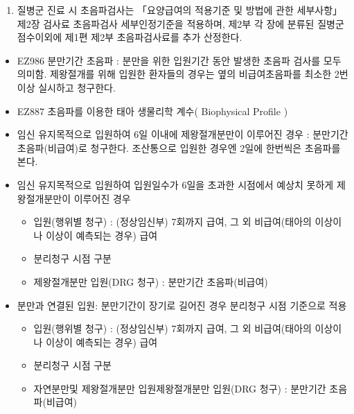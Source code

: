 \begin{myshadowbox}
\begin{enumerate}[15.]\tightlist
\item 질병군 진료 시 초음파검사는 「요양급여의 적용기준 및 방법에 관한 세부사항」제2장 검사료 초음파검사 세부인정기준을 적용하며,  제2부 각 장에 분류된 질병군 점수이외에 제1편 제2부 초음파검사료를 추가 산정한다. 
\end{enumerate}
\end{myshadowbox}
\prezi{\clearpage}
\begin{itemize}\tightlist
	\item EZ986 분만기간 초음파 : 분만을 위한 입원기간 동안 발생한 초음파 검사를 모두 의미함. 제왕절개를 위해 입원한 환자들의 경우는 옆의 비급여초음파를 최소한 2번 이상 실시하고 청구한다.
	\item EZ887 초음파를 이용한 태아 생물리학 계수( Biophysical Profile )
	\item 임신 유지목적으로 입원하여 6일 이내에 제왕절개분만이 이루어진 경우 : 분만기간 초음파(비급여)로 청구한다. 조산통으로 입원한 경우엔 2일에 한번씩은 초음파를 본다.
	\item 임신 유지목적으로 입원하여 입원일수가 6일을 초과한 시점에서 예상치 못하게 제왕절개분만이 이루어진 경우 
		\begin{itemize}\tightlist
		\item 입원(행위별 청구) : (정상임신부) 7회까지 급여, 그 외 비급여(태아의 이상이나 이상이 예측되는 경우) 급여
		\item 분리청구 시점 구분
		\item 제왕절개분만 입원(DRG 청구) : 분만기간 초음파(비급여)
         \end{itemize}                               
	\item 분만과 연결된 입원: 분만기간이 장기로 길어진 경우 분리청구 시점 기준으로 적용
		\begin{itemize}\tightlist
		\item 입원(행위별 청구) : (정상임신부) 7회까지 급여, 그 외 비급여(태아의 이상이나 이상이 예측되는 경우) 급여
		\item 분리청구 시점 구분
		\item 자연분만및 제왕절개분만 입원제왕절개분만 입원(DRG 청구) : 분만기간 초음파(비급여)
         \end{itemize} 	
\end{itemize}
